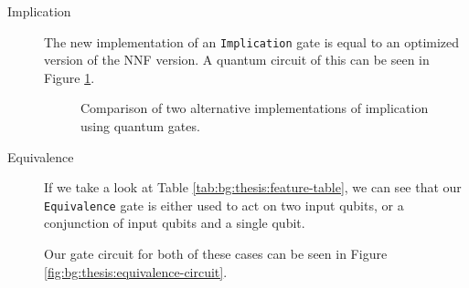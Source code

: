 \begin{description}
    \item[Implication] The new implementation of an \texttt{Implication} gate is equal to an optimized version of the NNF version.
    A quantum circuit of this can be seen in Figure \ref{fig:bg:thesis:implication}. 

    \begin{figure}[H]
        \centering
        \caption[Implication implementation]{
            Comparison of two alternative implementations of implication using quantum gates.}
        \label{fig:bg:thesis:implication}
    \end{figure} 

    \item[Equivalence]
    If we take a look at Table \ref{tab:bg:thesis:feature-table}, we can see that our \texttt{Equivalence} gate is either used to act on two input qubits, or a conjunction of input qubits and a single qubit.

    Our gate circuit for both of these cases can be seen in Figure \ref{fig:bg:thesis:equivalence-circuit}. 
    

\end{description}
